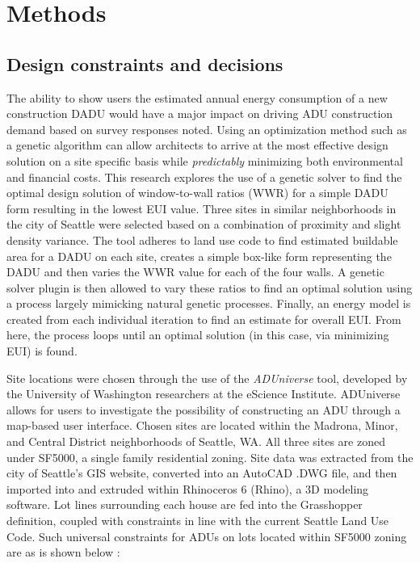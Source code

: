 \documentclass[sagev,doublespace,times,Review]{sagej}
\begin{document}
\section{Methods} 
\subsection{Design constraints and decisions}
The ability to show users the estimated annual energy consumption of a new construction DADU would have a major impact on driving ADU construction demand based on survey responses noted. Using an optimization method such as a genetic algorithm can allow architects to arrive at the most effective design solution on a site specific basis while \textit{predictably} minimizing both environmental and financial costs. This research explores the use of a genetic solver to find the optimal design solution of window-to-wall ratios (WWR) for a simple DADU form resulting in the lowest EUI value. Three sites in similar neighborhoods in the city of Seattle were selected based on a combination of proximity and slight density variance. The tool adheres to land use code to find estimated buildable area for a DADU on each site, creates a simple box-like form representing the DADU and then varies the WWR value for each of the four walls. A genetic solver plugin is then allowed to vary these ratios to find an optimal solution using a process largely mimicking natural genetic processes. Finally, an energy model is created from each individual iteration to find an estimate for overall EUI. From here, the process loops until an optimal solution (in this case, via minimizing EUI) is found.

Site locations were chosen through the use of the \textit{ADUniverse} tool, developed by the University of Washington researchers at the eScience Institute\cite{ADUniverseToolEScience}. ADUniverse allows for users to investigate the possibility of constructing an ADU through a map-based user interface. Chosen sites are located within the Madrona, Minor, and Central District neighborhoods of Seattle, WA. All three sites are zoned under SF5000, a single family residential zoning. Site data was extracted from the city of Seattle's GIS website, converted into an AutoCAD .DWG file, and then imported into and extruded within Rhinoceros 6 (Rhino), a 3D modeling software. Lot lines surrounding each house are fed into the Grasshopper definition, coupled with constraints in line with the current Seattle Land Use Code. Such universal constraints for ADUs on lots located within SF5000 zoning are as is shown below \cite{ADURules}: 
\end{document}
